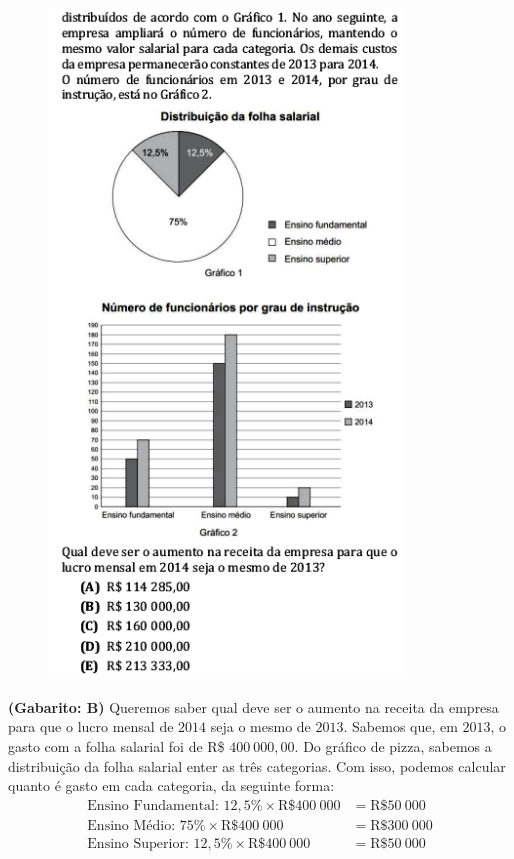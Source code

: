 \documentclass[a4paper]{article}
\begin{document}
\begin{figure}[H]
	\begin{center}
		\includegraphics[width=9.5cm]{L1Q20_2.png}
	\end{center}
\end{figure}
\par\textbf{(Gabarito: B)} Queremos saber qual deve ser o aumento na receita da empresa para que o lucro mensal de $2014$ seja o mesmo de $2013$. Sabemos que, em $2013$, o gasto com a folha salarial foi de R\$ $400\ 000,00$. Do gráfico de pizza, sabemos a distribuição da folha salarial enter as três categorias. Com isso, podemos calcular quanto é gasto em cada categoria, da seguinte forma:
\begin{align*}
\text{Ensino Fundamental: }12,5\%\times \text{R\$}400\ 000 &= \text{R\$}50\ 000 \\ 
\text{Ensino Médio: }75\%\times \text{R\$}400\ 000 &= \text{R\$}300\ 000 \\
\text{Ensino Superior: }12,5\%\times \text{R\$}400\ 000 &= \text{R\$}50\ 000 
\end{align*}
\end{document}
